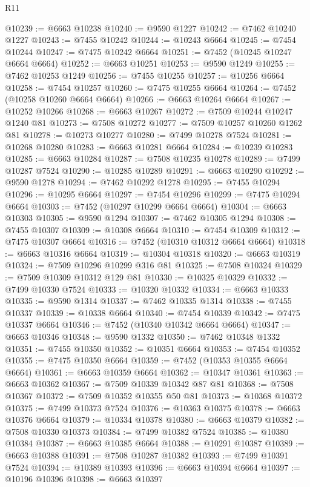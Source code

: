 \begin{lexlean}{R11}
\begin{coremodule}
@10239 := @6663 @10238
@10240 := @9590 @1227
@10242 := @7462 @10240 @1227
@10243 := @7455 @10242
@10244 := @10243 @6664
@10245 := @7454 @10244
@10247 := @7475 @10242 @6664
@10251 := @7452 (@10245 @10247 @6664 @6664)
@10252 := @6663 @10251
@10253 := @9590 @1249
@10255 := @7462 @10253 @1249
@10256 := @7455 @10255
@10257 := @10256 @6664
@10258 := @7454 @10257
@10260 := @7475 @10255 @6664
@10264 := @7452 (@10258 @10260 @6664 @6664)
@10266 := @6663 @10264 @6664
@10267 := @10252 @10266
@10268 := @6663 @10267
@10272 := @7509 @10244 @10247 @1240 @81
@10273 := @7508 @10272
@10277 := @7509 @10257 @10260 @1262 @81
@10278 := @10273 @10277
@10280 := @7499 @10278 @7524
@10281 := @10268 @10280
@10283 := @6663 @10281 @6664
@10284 := @10239 @10283
@10285 := @6663 @10284
@10287 := @7508 @10235 @10278
@10289 := @7499 @10287 @7524
@10290 := @10285 @10289
@10291 := @6663 @10290
@10292 := @9590 @1278
@10294 := @7462 @10292 @1278
@10295 := @7455 @10294
@10296 := @10295 @6664
@10297 := @7454 @10296
@10299 := @7475 @10294 @6664
@10303 := @7452 (@10297 @10299 @6664 @6664)
@10304 := @6663 @10303
@10305 := @9590 @1294
@10307 := @7462 @10305 @1294
@10308 := @7455 @10307
@10309 := @10308 @6664
@10310 := @7454 @10309
@10312 := @7475 @10307 @6664
@10316 := @7452 (@10310 @10312 @6664 @6664)
@10318 := @6663 @10316 @6664
@10319 := @10304 @10318
@10320 := @6663 @10319
@10324 := @7509 @10296 @10299 @316 @81
@10325 := @7508 @10324
@10329 := @7509 @10309 @10312 @129 @81
@10330 := @10325 @10329
@10332 := @7499 @10330 @7524
@10333 := @10320 @10332
@10334 := @6663 @10333
@10335 := @9590 @1314
@10337 := @7462 @10335 @1314
@10338 := @7455 @10337
@10339 := @10338 @6664
@10340 := @7454 @10339
@10342 := @7475 @10337 @6664
@10346 := @7452 (@10340 @10342 @6664 @6664)
@10347 := @6663 @10346
@10348 := @9590 @1332
@10350 := @7462 @10348 @1332
@10351 := @7455 @10350
@10352 := @10351 @6664
@10353 := @7454 @10352
@10355 := @7475 @10350 @6664
@10359 := @7452 (@10353 @10355 @6664 @6664)
@10361 := @6663 @10359 @6664
@10362 := @10347 @10361
@10363 := @6663 @10362
@10367 := @7509 @10339 @10342 @87 @81
@10368 := @7508 @10367
@10372 := @7509 @10352 @10355 @50 @81
@10373 := @10368 @10372
@10375 := @7499 @10373 @7524
@10376 := @10363 @10375
@10378 := @6663 @10376 @6664
@10379 := @10334 @10378
@10380 := @6663 @10379
@10382 := @7508 @10330 @10373
@10384 := @7499 @10382 @7524
@10385 := @10380 @10384
@10387 := @6663 @10385 @6664
@10388 := @10291 @10387
@10389 := @6663 @10388
@10391 := @7508 @10287 @10382
@10393 := @7499 @10391 @7524
@10394 := @10389 @10393
@10396 := @6663 @10394 @6664
@10397 := @10196 @10396
@10398 := @6663 @10397

\end{coremodule}
\end{lexlean}
